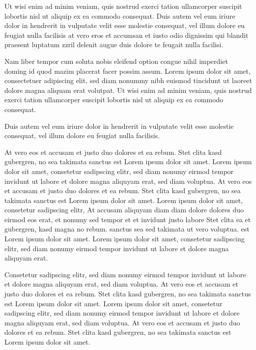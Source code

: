 \documentclass[twoside,a4paper]{article}
\begin{document}
Ut wisi enim ad minim veniam, quis nostrud exerci tation ullamcorper suscipit lobortis nisl ut aliquip ex ea commodo consequat. Duis autem vel eum iriure dolor in hendrerit in vulputate velit esse molestie consequat, vel illum dolore eu feugiat nulla facilisis at vero eros et accumsan et iusto odio dignissim qui blandit praesent luptatum zzril delenit augue duis dolore te feugait nulla facilisi.

Nam liber tempor cum soluta nobis eleifend option congue nihil imperdiet doming id quod mazim placerat facer possim assum. Lorem ipsum dolor sit amet, consectetuer adipiscing elit, sed diam nonummy nibh euismod tincidunt ut laoreet dolore magna aliquam erat volutpat. Ut wisi enim ad minim veniam, quis nostrud exerci tation ullamcorper suscipit lobortis nisl ut aliquip ex ea commodo consequat.

Duis autem vel eum iriure dolor in hendrerit in vulputate velit esse molestie consequat, vel illum dolore eu feugiat nulla facilisis.

At vero eos et accusam et justo duo dolores et ea rebum. Stet clita kasd gubergren, no sea takimata sanctus est Lorem ipsum dolor sit amet. Lorem ipsum dolor sit amet, consetetur sadipscing elitr, sed diam nonumy eirmod tempor invidunt ut labore et dolore magna aliquyam erat, sed diam voluptua. At vero eos et accusam et justo duo dolores et ea rebum. Stet clita kasd gubergren, no sea takimata sanctus est Lorem ipsum dolor sit amet. Lorem ipsum dolor sit amet, consetetur sadipscing elitr, At accusam aliquyam diam diam dolore dolores duo eirmod eos erat, et nonumy sed tempor et et invidunt justo labore Stet clita ea et gubergren, kasd magna no rebum. sanctus sea sed takimata ut vero voluptua. est Lorem ipsum dolor sit amet. Lorem ipsum dolor sit amet, consetetur sadipscing elitr, sed diam nonumy eirmod tempor invidunt ut labore et dolore magna aliquyam erat.

Consetetur sadipscing elitr, sed diam nonumy eirmod tempor invidunt ut labore et dolore magna aliquyam erat, sed diam voluptua. At vero eos et accusam et justo duo dolores et ea rebum. Stet clita kasd gubergren, no sea takimata sanctus est Lorem ipsum dolor sit amet. Lorem ipsum dolor sit amet, consetetur sadipscing elitr, sed diam nonumy eirmod tempor invidunt ut labore et dolore magna aliquyam erat, sed diam voluptua. At vero eos et accusam et justo duo dolores et ea rebum. Stet clita kasd gubergren, no sea takimata sanctus est Lorem ipsum dolor sit amet. 
\end{document}
